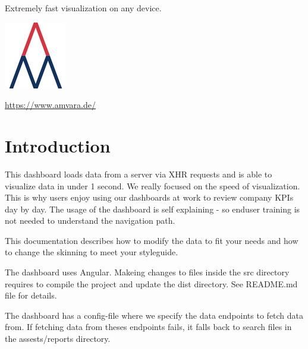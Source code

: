 \documentclass[11pt]{article}
\begin{document}
 
\maketitle %
\thispagestyle{empty}

\begin{centering} %
	Extremely fast visualization on any device.
	\bigskip
	\par
	\bigskip
	\bigskip
	\bigskip
	\bigskip
	\bigskip
	\bigskip
	\bigskip
	\bigskip
	\bigskip
	\bigskip	
	\bigskip
	\bigskip
	\bigskip
	\bigskip
	\bigskip
	\bigskip
	\bigskip
	\bigskip
	\bigskip
	\bigskip
	\bigskip
	\bigskip
	\includegraphics{amvara} \par
	\bigskip
	\url{https://www.amvara.de/} \par
	\bigskip
	\bigskip
	\date{\today}\par %
\end{centering}

\newpage %
\tableofcontents %
\thispagestyle{empty}
\newpage



\section{Introduction} %
This dashboard loads data from a server via XHR requests and is able to visualize data in under 1 second. We really focused on the speed of visualization. This is why users enjoy using our dashboards at work to review company KPIs day by day. The usage of the dashboard is self explaining - so enduser training is not needed to understand the navigation path. 
\bigskip

This documentation describes how to modify the data to fit your needs and how to change the skinning to meet your styleguide.
\bigskip

The dashboard uses Angular. Makeing changes to files inside the src directory requires to compile the project and update the dist directory. See README.md file for details.
\bigskip

The dashboard has a config-file where we specify the data endpoints to fetch data from. If fetching data from theses endpoints fails, it falls back to search files in the assests/reports directory. 
\bigskip
\end{document}
